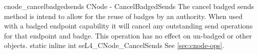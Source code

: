 %
%
%
%

\apidoc
{cnode_cancelbadgedsends}
{CNode  -  CancelBadgedSends}
{The cancel badged sends method is intend to allow for the reuse of badges by an
authority. When used with a badged endpoint capability it
will cancel any outstanding send operations for that endpoint and badge.
This operation has no effect on un-badged or other objects.}
{static inline int seL4\_CNode\_CancelSends}
{
}
{\errorenumdesc}
{See \autoref{sec:cnode-ops}.}

